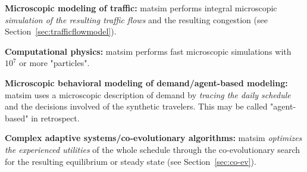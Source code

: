 \begin{compactitem}
%
\item \textbf{Microscopic modeling of traffic:} \gls{matsim} performs integral microscopic \emph{simulation of the resulting traffic flows} and the resulting congestion (see Section~\ref{sec:trafficflowmodel}).
%
\item \textbf{Computational physics:}
\gls{matsim} performs fast microscopic simulations with $10^7$ or more "particles".
%
\item \textbf{Microscopic behavioral modeling of demand/agent-based modeling:}
\gls{matsim} uses a microscopic description of demand by \emph{tracing the daily schedule} and the decisions involved of the synthetic travelers.  This may be called "agent-based" in retrospect. 
%
\item  \textbf{Complex adaptive systems/co-evolutionary algorithms:}
\gls{matsim} \emph{optimizes the experienced utilities} of the whole schedule through the co-evolutionary search for the resulting equilibrium or steady state (see Section~\ref{sec:co-ev}). 
%

\end{compactitem}




